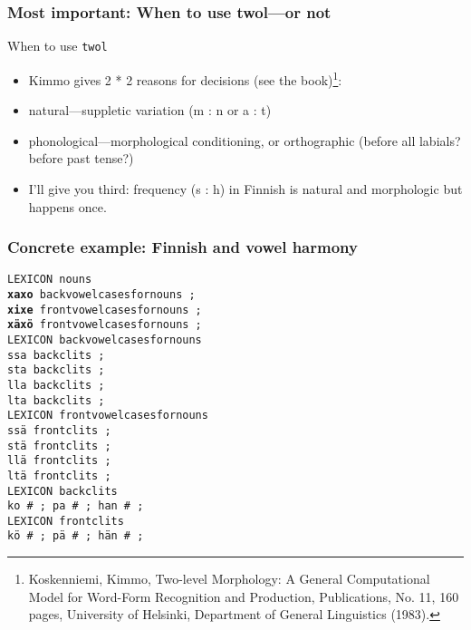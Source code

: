 \documentclass[10pt,xetex]{beamer} %
\begin{document}
\begin{frame}
    \frametitle{Most important: When to use twol---or not}
    \begin{block}{When to use \texttt{twol}}
        \begin{itemize}
            \item Kimmo gives 2 * 2 reasons for decisions (see the
                book)\footnote{Koskenniemi, Kimmo, Two-level Morphology: A
                General Computational Model for Word-Form Recognition and
                Production, Publications, No. 11, 160 pages, University of
                Helsinki, Department of General Linguistics (1983).}:
            \item natural---suppletic variation (m : n or a : t)
            \item phonological---morphological conditioning, or orthographic
                (before all labials? before past tense?)
            \item I'll give you third: frequency (s : h) in Finnish is natural and
                morphologic but happens once.
        \end{itemize}
    \end{block}
\end{frame}

\begin{frame}
    \frametitle{Concrete example: Finnish and vowel harmony}
\texttt{LEXICON nouns\\
\textbf{xaxo} backvowelcasesfornouns ; \\
\textbf{xixe} frontvowelcasesfornouns ; \\
\textbf{xäxö} frontvowelcasesfornouns ;\\
LEXICON backvowelcasesfornouns\\
ssa backclits ; \\
sta backclits ; \\
lla backclits ;\\
lta backclits ;\\
LEXICON frontvowelcasesfornouns\\
ssä frontclits ;  \\
stä frontclits ; \\
llä frontclits ; \\
ltä frontclits ;\\
LEXICON backclits\\
ko \# ; pa \# ; han \# ;\\
LEXICON frontclits\\
kö \# ; pä \# ; hän \# ;\\
    }
\end{frame}
\end{document}
